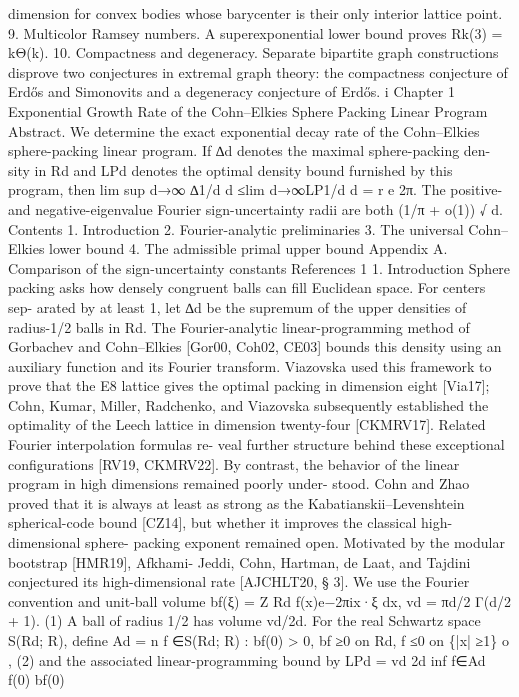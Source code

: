 dimension for convex bodies whose barycenter is their only interior lattice point.
9.
Multicolor Ramsey numbers. A superexponential lower bound proves Rk(3) =
kΘ(k).
10.
Compactness and degeneracy. Separate bipartite graph constructions disprove
two conjectures in extremal graph theory: the compactness conjecture of Erdős and
Simonovits and a degeneracy conjecture of Erdős.
i
Chapter 1
Exponential Growth Rate of the Cohn–Elkies
Sphere Packing Linear Program
Abstract. We determine the exact exponential decay rate of the Cohn–Elkies
sphere-packing linear program. If ∆d denotes the maximal sphere-packing den-
sity in Rd and LPd denotes the optimal density bound furnished by this program,
then
lim sup
d→∞
∆1/d
d
≤lim
d→∞LP1/d
d
=
r e
2π.
The positive- and negative-eigenvalue Fourier sign-uncertainty radii are both
(1/π + o(1))
√
d.
Contents
1.
Introduction
2.
Fourier-analytic preliminaries
3.
The universal Cohn–Elkies lower bound
4.
The admissible primal upper bound
Appendix A.
Comparison of the sign-uncertainty constants
References
1
1. Introduction
Sphere packing asks how densely congruent balls can ﬁll Euclidean space. For centers sep-
arated by at least 1, let ∆d be the supremum of the upper densities of radius-1/2 balls in Rd.
The Fourier-analytic linear-programming method of Gorbachev and Cohn–Elkies [Gor00, Coh02,
CE03] bounds this density using an auxiliary function and its Fourier transform. Viazovska used
this framework to prove that the E8 lattice gives the optimal packing in dimension eight [Via17];
Cohn, Kumar, Miller, Radchenko, and Viazovska subsequently established the optimality of the
Leech lattice in dimension twenty-four [CKMRV17]. Related Fourier interpolation formulas re-
veal further structure behind these exceptional conﬁgurations [RV19, CKMRV22].
By contrast, the behavior of the linear program in high dimensions remained poorly under-
stood. Cohn and Zhao proved that it is always at least as strong as the Kabatianskii–Levenshtein
spherical-code bound [CZ14], but whether it improves the classical high-dimensional sphere-
packing exponent remained open. Motivated by the modular bootstrap [HMR19], Afkhami-
Jeddi, Cohn, Hartman, de Laat, and Tajdini conjectured its high-dimensional rate [AJCHLT20,
§ 3].
We use the Fourier convention and unit-ball volume
bf(ξ) =
Z
Rd f(x)e−2πix·ξ dx,
vd =
πd/2
Γ(d/2 + 1).
(1)
A ball of radius 1/2 has volume vd/2d. For the real Schwartz space S(Rd; R), deﬁne
Ad =
n
f ∈S(Rd; R) : bf(0) > 0,
bf ≥0 on Rd,
f ≤0 on \{|x| ≥1\}
o
,
(2)
and the associated linear-programming bound by
LPd = vd
2d inf
f∈Ad
f(0)
bf(0)
